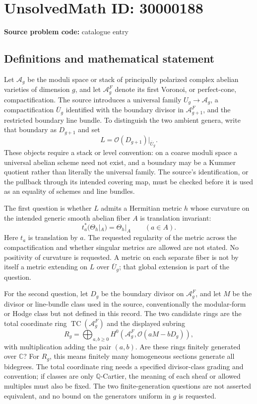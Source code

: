 \documentclass[11pt]{article}
\newcommand{\Q}{\mathbb{Q}}
\newcommand{\C}{\mathbb{C}}
\begin{document}
\section*{UnsolvedMath ID: 30000188}
\textbf{Source problem code:} catalogue entry
\subsection{Definitions and mathematical statement}
Let \(\mathcal A_g\) be the moduli space or stack of principally polarized complex abelian varieties of dimension \(g\), and let \(\mathcal A_g^F\) denote its first Voronoi, or perfect-cone, compactification. The source introduces a universal family \(U_g\to\mathcal A_g\), a compactification \(\overline U_g\) identified with the boundary divisor in \(\mathcal A_{g+1}^F\), and the restricted boundary line bundle. To distinguish the two ambient genera, write that boundary as \(D_{g+1}\) and set
\[
L=\mathcal O(D_{g+1})|_{\overline U_g}.
\]
These objects require a stack or level convention: on a coarse moduli space a universal abelian scheme need not exist, and a boundary may be a Kummer quotient rather than literally the universal family. The source's identification, or the pullback through its intended covering map, must be checked before it is used as an equality of schemes and line bundles.

The first question is whether \(L\) admits a Hermitian metric \(h\) whose curvature on the intended generic smooth abelian fiber \(A\) is translation invariant:
\[
t_a^*(\Theta_h|_A)=\Theta_h|_A\qquad(a\in A).
\]
Here \(t_a\) is translation by \(a\). The requested regularity of the metric across the compactification and whether singular metrics are allowed are not stated. No positivity of curvature is requested. A metric on each separate fiber is not by itself a metric extending on \(L\) over \(\overline U_g\); that global extension is part of the question.

For the second question, let \(D_g\) be the boundary divisor on \(\mathcal A_g^F\), and let \(M\) be the divisor or line-bundle class used in the source, conventionally the modular-form or Hodge class but not defined in this record. The two candidate rings are the total coordinate ring \(\operatorname{TC}(\mathcal A_g^F)\) and the displayed subring
\[
R_g=\bigoplus_{a,b\geq0}H^0(\mathcal A_g^F,\mathcal O(aM-bD_g)),
\]
with multiplication adding the pair \((a,b)\). Are these rings finitely generated over \(\C\)? For \(R_g\), this means finitely many homogeneous sections generate all bidegrees. The total coordinate ring needs a specified divisor-class grading and convention; if classes are only \(\Q\)-Cartier, the meaning of each sheaf or allowed multiples must also be fixed. The two finite-generation questions are not asserted equivalent, and no bound on the generators uniform in \(g\) is requested.
\end{document}
